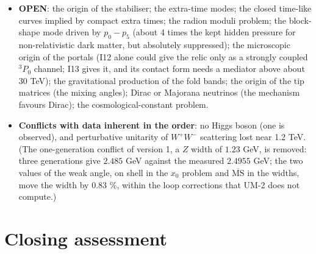 \documentclass[
  10pt,
]{article}
\begin{document}
\begin{itemize}
  elastic rate of the right-handed neutrinos; the effect of the
  order-\(\alpha\) plasma pressure on the relic (about 2.7 \% in
  \(\Omega_{\mathrm{DM}}h_{100}^2\), 1.4 \% in \(G_{\mathrm{A}}\)); the
  one-loop sensitivity of the nucleon mass.
\item
  \textbf{OPEN}: the origin of the stabiliser; the extra-time modes; the
  closed time-like curves implied by compact extra times; the radion
  moduli problem; the block-shape mode driven by \(p_0 - p_5\) (about 4
  times the kept hidden pressure for non-relativistic dark matter, but
  absolutely suppressed); the microscopic origin of the portals (I12
  alone could give the relic only as a strongly coupled \(^3P_0\)
  channel; I13 gives it, and its contact form needs a mediator above
  about 30 TeV); the gravitational production of the fold bands; the
  origin of the tip matrices (the mixing angles); Dirac or Majorana
  neutrinos (the mechanism favours Dirac); the cosmological-constant
  problem.
\item
  \textbf{Conflicts with data inherent in the order}: no Higgs boson
  (one is observed), and perturbative unitarity of \(W^+W^-\) scattering
  lost near 1.2 TeV. (The one-generation conflict of version 1, a \(Z\)
  width of \(1.23\) GeV, is removed: three generations give \(2.485\)
  GeV against the measured \(2.4955\) GeV; the two values of the weak
  angle, on shell in the \(x_0\) problem and \(\overline{\mathrm{MS}}\)
  in the widths, move the width by 0.83 \%, within the loop corrections
  that UM-2 does not compute.)
\end{itemize}

\hypertarget{closing-assessment}{%
\section*{Closing assessment}\label{closing-assessment}}
\end{document}
